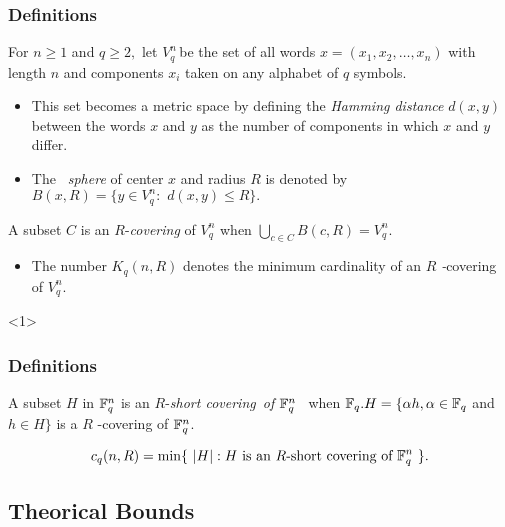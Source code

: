 \documentclass{beamer}
\begin{document}
\begin{frame}
  \frametitle{Definitions}
{	\footnotesize
  \begin{definition}
  For $n\geq 1$ and $q\geq 2,$ let $V_{q}^{n}\,$be the set of all words $%
x=(x_{1},x_{2},\ldots ,x_{n})$ with length $n$ and components $x_{i}$ taken on
any alphabet of $q$ symbols. 
  \end{definition}
  
	\begin{itemize}
		\item This set becomes a metric space by defining the
\textit{Hamming distance} $d(x,y)$ between the words $x$ and $y$ as the
number of components in which $x$ and $y$ differ.
		\item The \textit{\ sphere }of
center $x$ and radius $R$ is denoted by $B(x,R)=\{y\in
V_{q}^{n}:\,\,d(x,y)\leq R\}.$
	\end{itemize}
	
	\begin{definition}
	 A subset $C$ is an $R$-\textit{covering }of $%
V_{q}^{n}$ when $
\bigcup_{c\in C}B(c,R)=V_{q}^{n}. $
	\end{definition}
	
\begin{itemize}
	\item The number $K_{q}(n,R)$ denotes the minimum cardinality of an $R$%
\textit{-}covering of $V_{q}^{n}.$
\end{itemize}
}

\end{frame}

\begin{frame}<1>
  \frametitle{Definitions}
{	
  \begin{definition}
A subset $H$ in $\Bbb F_{q}^{n}$ is an $R$-\textit{short
covering\ of }$ \Bbb F_{q}^{n}$ \textit{\ }when
$ \Bbb F_{q}.H=\{\alpha h,\alpha \in \Bbb F_{q}$ and $h\in H\}$ is a $R$%
-covering of $\Bbb F_{q}^{n}$. 
 \end{definition}
  
  \begin{definition}
\[
c_{q}(n,R)=\min \{\ \left| H\right| :H \mbox{ is an } R
\mbox{-short
covering of } \Bbb F_{q}^{n}\mathit{\ }\}.
\]
  \end{definition}
	
}

\end{frame}

\subsection{Theorical Bounds}
\end{document}
